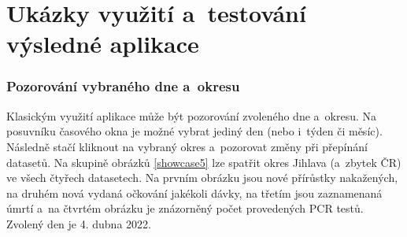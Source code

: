 \clearpage

\section{Ukázky využití a~testování výsledné aplikace}

\subsubsection*{Pozorování vybraného dne a~okresu}

Klasickým využití aplikace může být pozorování zvoleného dne a~okresu. Na posuvníku časového okna je možné vybrat jediný den (nebo i~týden či měsíc). Následně stačí kliknout na vybraný okres a~pozorovat změny při přepínání datasetů. Na skupině obrázků \ref{showcase5} lze spatřit okres Jihlava (a~zbytek ČR) ve všech čtyřech datasetech. Na prvním obrázku jsou nové přírůstky nakažených, na druhém nová vydaná očkování jakékoli dávky, na třetím jsou zaznamenaná úmrtí a~na čtvrtém obrázku je znázorněný počet provedených PCR testů. Zvolený den je 4. dubna 2022.

